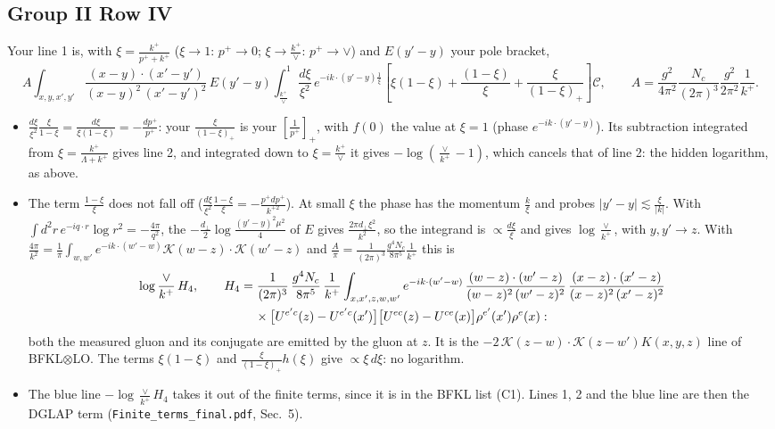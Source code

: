 \documentclass[10pt]{article}
\numberwithin{equation}{section}
\begin{document}
\subsection{Group II Row IV}
Your line 1 is, with $\xi=\frac{k^+}{p^++k^+}$ ($\xi\to1$: $p^+\to0$; $\xi\to\frac{k^+}{\vee}$: $p^+\to\vee$) and $E(y'-y)$ your pole bracket,
\begin{equation*}
A\int_{x,y,x',y'}\frac{(x-y)\cdot (x'-y')}{(x-y)^{2}\,(x'-y')^{2}}\,E(y'-y)\int_{\frac{k^{+}}{\vee}}^{1}\frac{d\xi}{\xi^{2}}\,e^{-ik\cdot (y'-y)\frac{1}{\xi}}\left[\xi(1-\xi)+\frac{(1-\xi)}{\xi}+\frac{\xi}{(1-\xi)_{+}}\right]\mathcal C,\qquad A=\frac{g^{2}}{4\pi^{2}}\frac{N_{c}}{(2\pi)^{3}}\frac{g^{2}}{2\pi^{2}}\frac{1}{k^{+}}.
\end{equation*}
\begin{itemize}
\item $\frac{d\xi}{\xi^2}\frac{\xi}{1-\xi}=\frac{d\xi}{\xi(1-\xi)}=-\frac{dp^+}{p^+}$: your $\frac{\xi}{(1-\xi)_+}$ is your $\left[\frac{1}{p^+}\right]_+$, with $f(0)$ the value at $\xi=1$ (phase $e^{-ik\cdot(y'-y)}$). Its subtraction integrated from $\xi=\frac{k^+}{\Lambda+k^+}$ gives line 2, and integrated down to $\xi=\frac{k^+}{\vee}$ it gives $-\log(\frac{\vee}{k^+}-1)$, which cancels that of line 2: the hidden logarithm, as above.
\item The term $\frac{1-\xi}{\xi}$ does not fall off ($\frac{d\xi}{\xi^2}\frac{1-\xi}{\xi}=-\frac{p^+dp^+}{k^{+2}}$). At small $\xi$ the phase has the momentum $\frac{k}{\xi}$ and probes $|y'-y|\lesssim\frac{\xi}{|k|}$. With $\int d^2r\,e^{-iq\cdot r}\log r^2=-\frac{4\pi}{q^2}$, the $-\frac{d_\perp}{2}\log\frac{(y'-y)^2\mu^2}{4}$ of $E$ gives $\frac{2\pi d_\perp\xi^2}{k^2}$, so the integrand is $\propto\frac{d\xi}{\xi}$ and gives $\log\frac{\vee}{k^+}$, with $y,y'\to z$. With $\frac{4\pi}{k^2}=\frac1\pi\int_{w,w'}e^{-ik\cdot(w'-w)}\mathcal K(w-z)\cdot\mathcal K(w'-z)$ and $\frac{A}{\pi}=\frac{1}{(2\pi)^3}\frac{g^4N_c}{8\pi^5}\frac{1}{k^+}$ this is
\begin{align*}
&\log\frac{\vee}{k^+}\,H_4,\qquad H_4=\frac{1}{(2\pi)^{3}}\,\frac{g^{4}N_{c}}{8\pi^{5}}\,\frac{1}{k^{+}}\int_{x,x',z,w,w'}e^{-ik\cdot (w'-w)}\,\frac{(w-z)\cdot(w'-z)}{(w-z)^{2}\,(w'-z)^{2}}\,\frac{(x-z)\cdot(x'-z)}{(x-z)^{2}\,(x'-z)^{2}}\\
&\hphantom{\log\frac{\vee}{k^+}\,H_4,\qquad H_4={}}\times\big[U^{e'c}(z)-U^{e'c}(x')\big]\big[U^{ec}(z)-U^{ce}(x)\big]\rho^{e'}(x')\rho^{e}(x):
\end{align*}
both the measured gluon and its conjugate are emitted by the gluon at $z$. It is the $-2\,\mathcal K(z-w)\cdot\mathcal K(z-w')K(x,y,z)$ line of BFKL$\otimes$LO. The terms $\xi(1-\xi)$ and $\frac{\xi}{(1-\xi)_+}h(\xi)$ give $\propto\xi\,d\xi$: no logarithm.
\item The blue line $-\log\frac{\vee}{k^+}H_4$ takes it out of the finite terms, since it is in the BFKL list (C1). Lines 1, 2 and the blue line are then the DGLAP term (\texttt{Finite\_terms\_final.pdf}, Sec.~5).
\end{itemize}
\end{document}
